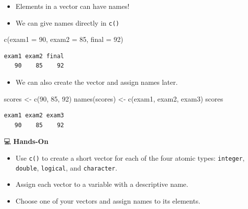 \documentclass[
  letterpaper,
  DIV=11,
  numbers=noendperiod]{scrreprt}
\newenvironment{Shaded}{\begin{snugshade}}{\end{snugshade}}
\newcommand{\AttributeTok}[1]{\textcolor[rgb]{0.40,0.45,0.13}{#1}}
\newcommand{\DecValTok}[1]{\textcolor[rgb]{0.68,0.00,0.00}{#1}}
\newcommand{\FunctionTok}[1]{\textcolor[rgb]{0.28,0.35,0.67}{#1}}
\newcommand{\NormalTok}[1]{\textcolor[rgb]{0.00,0.23,0.31}{#1}}
\newcommand{\OtherTok}[1]{\textcolor[rgb]{0.00,0.23,0.31}{#1}}
\newcommand{\StringTok}[1]{\textcolor[rgb]{0.13,0.47,0.30}{#1}}
\providecommand{\tightlist}{%
  \setlength{\itemsep}{0pt}\setlength{\parskip}{0pt}}\usepackage{longtable,booktabs,array}
\begin{document}
\begin{itemize}
\item
  Elements in a vector can have names!
\item
  We can give names directly in \texttt{c()}
\end{itemize}

\begin{Shaded}
\begin{Highlighting}[]
\FunctionTok{c}\NormalTok{(}\AttributeTok{exam1 =} \DecValTok{90}\NormalTok{, }\AttributeTok{exam2 =} \DecValTok{85}\NormalTok{, }\AttributeTok{final =} \DecValTok{92}\NormalTok{)}
\end{Highlighting}
\end{Shaded}

\begin{verbatim}
exam1 exam2 final 
   90    85    92 
\end{verbatim}

\begin{itemize}
\tightlist
\item
  We can also create the vector and assign names later.
\end{itemize}

\begin{Shaded}
\begin{Highlighting}[]
\NormalTok{scores }\OtherTok{\textless{}{-}} \FunctionTok{c}\NormalTok{(}\DecValTok{90}\NormalTok{, }\DecValTok{85}\NormalTok{, }\DecValTok{92}\NormalTok{)}
\FunctionTok{names}\NormalTok{(scores) }\OtherTok{\textless{}{-}} \FunctionTok{c}\NormalTok{(}\StringTok{\textquotesingle{}exam1\textquotesingle{}}\NormalTok{, }\StringTok{\textquotesingle{}exam2\textquotesingle{}}\NormalTok{, }\StringTok{\textquotesingle{}exam3\textquotesingle{}}\NormalTok{)}
\NormalTok{scores}
\end{Highlighting}
\end{Shaded}

\begin{verbatim}
exam1 exam2 exam3 
   90    85    92 
\end{verbatim}

💻 \textbf{Hands-On}

\begin{itemize}
\item
  Use \texttt{c()} to create a short vector for each of the four atomic
  types: \texttt{integer}, \texttt{double}, \texttt{logical}, and
  \texttt{character}.
\item
  Assign each vector to a variable with a descriptive name.
\item
  Choose one of your vectors and assign names to its elements.
\end{itemize}
\end{document}
